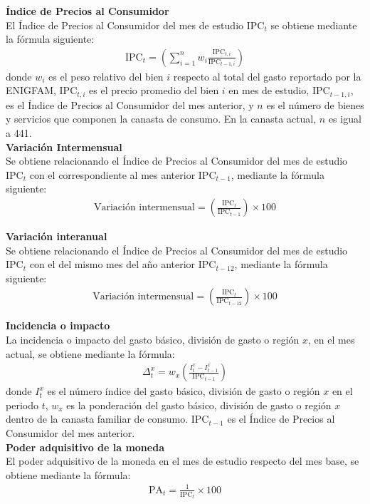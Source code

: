 {\setlength{\parindent}{0cm} 
\newcommand{\IPC}[1]{\text{IPC}_{#1}}
\textbf{Índice de Precios al Consumidor}\\
El Índice de Precios al Consumidor del mes de estudio $\IPC{t}$ se obtiene mediante la fórmula siguiente:
\begin{align*}
	\IPC{t} = \left(\sum_{i=1}^{n} w_i \frac{\IPC{t,i}}{\IPC{t-1,i}} \right)
\end{align*}
donde $w_i$ es el peso relativo del bien $i$ respecto al total del gasto reportado por la ENIGFAM, $\IPC{t,i}$ es el precio promedio del bien $i$ en mes de estudio, $\IPC{t-1,i}$, es el Índice de Precios al Consumidor del mes anterior, y $n$ es el número de bienes y servicios que componen la canasta de consumo. En la canasta actual, $n$ es igual a 441.\\

\textbf{Variación Intermensual}\\
Se obtiene relacionando el Índice de Precios al Consumidor del mes de estudio $\IPC{t}$ con el correspondiente al mes anterior $\IPC{t-1}$, mediante la fórmula siguiente:
\begin{align*}
	\text{Variación intermensual} = \left( \frac{\IPC{t}}{\IPC{t-1}} \right) \times 100
\end{align*}

\textbf{Variación interanual}\\
Se obtiene relacionando el Índice de Precios al Consumidor del mes de estudio $\IPC{t}$ con el del mismo mes del año anterior $\IPC{t-12}$, mediante la fórmula siguiente:
\begin{align*}
	\text{Variación intermensual} = \left( \frac{\IPC{t}}{\IPC{t-12}} \right) \times 100
\end{align*}

\textbf{Incidencia o impacto}\\
La incidencia o impacto del gasto básico, división de gasto o región $x$, en el mes actual, se obtiene mediante la fórmula:
\begin{align*}
	\Delta_{t}^{x} = w_x \left( \frac{I_t^x - I_{t-1}^x}{\IPC{t-1}} \right)
\end{align*}
donde $I_t^x$ es el número índice del gasto básico, división de gasto o región $x$ en el periodo $t$, $w_x$ es la ponderación del gasto básico, división de gasto o región $x$ dentro de la canasta familiar de consumo. $\IPC{t-1}$ es el Índice de Precios al Consumidor del mes anterior.\\

\textbf{Poder adquisitivo de la moneda}\\
El poder adquisitivo de la moneda en el mes de estudio respecto del mes base, se obtiene mediante la fórmula:
\begin{align*}
	\text{PA}_t = \frac{1}{\IPC{t}} \times 100
\end{align*}
}